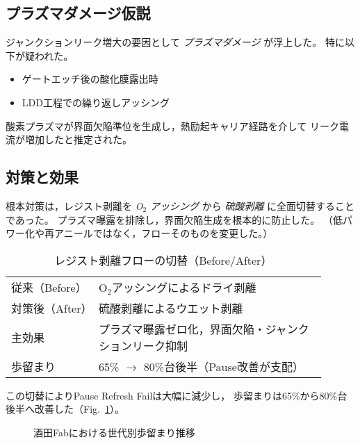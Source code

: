 \documentclass[conference]{IEEEtran}
\begin{document}
\subsection{プラズマダメージ仮説}
ジャンクションリーク増大の要因として \emph{プラズマダメージ} が浮上した。
特に以下が疑われた。
\begin{itemize}
  \item ゲートエッチ後の酸化膜露出時
  \item LDD工程での繰り返しアッシング
\end{itemize}
酸素プラズマが界面欠陥準位を生成し，熱励起キャリア経路を介して
リーク電流が増加したと推定された。

\subsection{対策と効果}
根本対策は，レジスト剥離を \emph{O$_2$ アッシング} から
\emph{硫酸剥離} に全面切替することであった。
プラズマ曝露を排除し，界面欠陥生成を根本的に防止した。
（低パワー化や再アニールではなく，フローそのものを変更した。）

\begin{table}[t]
  \centering
  \caption{レジスト剥離フローの切替（Before/After）}
  \label{tab:resist_flow}
  \begin{tabular}{p{0.25\linewidth} p{0.65\linewidth}}
    \toprule
    従来（Before） & O$_2$アッシングによるドライ剥離 \\
    対策後（After） & 硫酸剥離によるウエット剥離 \\
    主効果 & プラズマ曝露ゼロ化，界面欠陥・ジャンクションリーク抑制 \\
    歩留まり & 65\% $\rightarrow$ 80\%台後半（Pause改善が支配） \\
    \bottomrule
  \end{tabular}
\end{table}

この切替によりPause Refresh Failは大幅に減少し，
歩留まりは65\%から80\%台後半へ改善した（Fig.~\ref{fig:yield_trend}）。

\begin{figure}[t]
\centering
{}
\caption{酒田Fabにおける世代別歩留まり推移}
\label{fig:yield_trend}
\end{figure}
\end{document}
